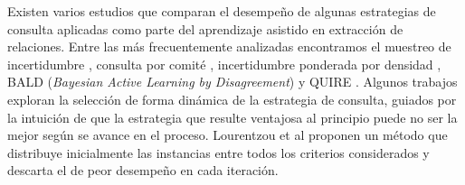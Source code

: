 Existen varios estudios que comparan el desempeño de algunas estrategias de consulta aplicadas como parte del aprendizaje asistido en extracción de relaciones. Entre las más frecuentemente analizadas encontramos el muestreo de incertidumbre \cite{lourentzou2018exploring, lourentzou2018mining, lourentzou2018difficult, roth2008pipeline, sun2012active}, consulta por comité \cite{angeli2014combining}, incertidumbre ponderada por densidad \cite{lourentzou2018mining}, BALD (\textit{Bayesian Active Learning by Disagreement}) \cite{lourentzou2018exploring, lourentzou2018mining}
y QUIRE \cite{lourentzou2018exploring, lourentzou2018mining}. Algunos trabajos exploran la selección de forma dinámica de la estrategia de consulta, guiados por la intuición de que la estrategia que resulte ventajosa al principio puede no ser la mejor según se avance en el proceso. Lourentzou et al \cite{lourentzou2018mining} proponen un método que distribuye inicialmente las instancias entre todos los criterios considerados y descarta el de peor desempeño en cada iteración.
%
%


